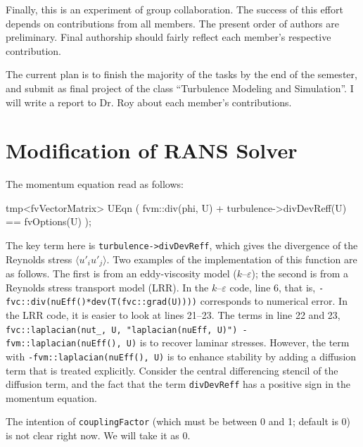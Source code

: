 \documentclass[paper = letter, fontsize = 11pt]{scrartcl} %
\begin{document}
Finally, this is an experiment of group collaboration. The success of this effort depends on
contributions from all members. The present order of authors are preliminary.  Final authorship
should fairly reflect each member's respective contribution. 

The current plan is to finish the majority of the tasks by the end of the semester, and submit as
final project of the class ``Turbulence Modeling and Simulation''. I will write a report to Dr. Roy
about each member's contributions.



\section{Modification of RANS Solver}



The momentum equation read as follows:

\begin{CPP}
    tmp<fvVectorMatrix> UEqn
    (
        fvm::div(phi, U)
      + turbulence->divDevReff(U)
      ==
        fvOptions(U)
    );
\end{CPP}

The key term here is \verb+turbulence->divDevReff+, which gives the divergence of the Reynolds
stress $\langle u'_i u'_j \rangle$.  Two examples of the implementation of this function are as
follows. The first is from an eddy-viscosity model ($k$--$\varepsilon$); the second is from a
Reynolds stress transport model (LRR).  In the $k$--$\varepsilon$ code, line 6, that is,
\verb+- fvc::div(nuEff()*dev(T(fvc::grad(U))))+ corresponds to numerical error.  In the LRR code, it
is easier to look at lines 21--23.  The terms in line 22 and 23,
\verb&fvc::laplacian(nut_, U, "laplacian(nuEff, U)") - fvm::laplacian(nuEff(), U)& is to recover
laminar stresses. However, the term with \verb+-fvm::laplacian(nuEff(), U)+ is to enhance stability
by adding a diffusion term that is treated explicitly. Consider the central differencing stencil of
the diffusion term, and the fact that the term \verb+divDevReff+ has a positive sign in the momentum
equation.

The intention of \verb+couplingFactor+ (which must be between 0 and 1; default is 0) is not clear
right now.  We will take it as 0.
\end{document}
